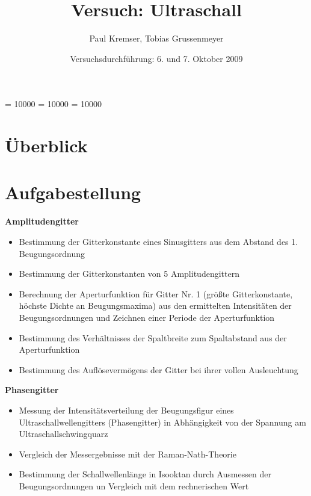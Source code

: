 \documentclass[12pt]{article}
\newcommand{\changefont}[3]{
\fontfamily{#1} \fontseries{#2} \fontshape{#3} \selectfont}
\begin{document}
\clubpenalty = 10000
\widowpenalty = 10000 
\displaywidowpenalty = 10000

\onehalfspacing
\changefont{ptm}{m}{n} 

\begin{titlepage}
\author{Paul Kremser, Tobias Grussenmeyer}
\title{Versuch: Ultraschall}
\date{Versuchsdurchführung: 6. und 7. Oktober 2009} 
\maketitle
\thispagestyle{empty}
\end{titlepage}


\tableofcontents
\thispagestyle{empty}
\newpage
{}
\section{Überblick}

\section{Aufgabestellung}
\textbf{Amplitudengitter}
\begin{itemize}
 \item Bestimmung der Gitterkonstante eines Sinusgitters aus dem Abstand des 1. Beugungsordnung
 \item Bestimmung der Gitterkonstanten von 5 Amplitudengittern
 \item Berechnung der Aperturfunktion für Gitter Nr. 1 (größte Gitterkonstante, höchste Dichte an Beugungsmaxima) aus den ermittelten Intensitäten
 der Beugungsordnungen und Zeichnen einer Periode der Aperturfunktion
 \item Bestimmung des Verhältnisses der Spaltbreite zum Spaltabstand aus der Aperturfunktion
 \item Bestimmung des Auflösevermögens der Gitter bei ihrer vollen Ausleuchtung
\end{itemize}

\textbf{Phasengitter}
\begin{itemize}
 \item Messung der Intensitätsverteilung der Beugungsfigur eines Ultraschallwellengitters (Phasengitter) in Abhängigkeit von der Spannung am
 Ultraschallschwingquarz
 \item Vergleich der Messergebnisse mit der Raman-Nath-Theorie
 \item Bestimmung der Schallwellenlänge in Isooktan durch Ausmessen der Beugungsordnungen un Vergleich mit dem rechnerischen Wert
\end{itemize}
\end{document}
